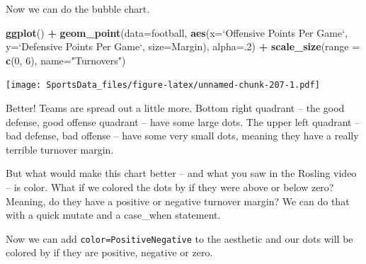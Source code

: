 \documentclass[]{book}
\newenvironment{Shaded}{\begin{snugshade}}{\end{snugshade}}
\newcommand{\DataTypeTok}[1]{\textcolor[rgb]{0.13,0.29,0.53}{#1}}
\newcommand{\DecValTok}[1]{\textcolor[rgb]{0.00,0.00,0.81}{#1}}
\newcommand{\KeywordTok}[1]{\textcolor[rgb]{0.13,0.29,0.53}{\textbf{#1}}}
\newcommand{\NormalTok}[1]{#1}
\newcommand{\OperatorTok}[1]{\textcolor[rgb]{0.81,0.36,0.00}{\textbf{#1}}}
\newcommand{\StringTok}[1]{\textcolor[rgb]{0.31,0.60,0.02}{#1}}
\begin{document}
Now we can do the bubble chart.

\begin{Shaded}
\begin{Highlighting}[]
\KeywordTok{ggplot}\NormalTok{() }\OperatorTok{+}\StringTok{ }\KeywordTok{geom_point}\NormalTok{(}\DataTypeTok{data=}\NormalTok{football, }\KeywordTok{aes}\NormalTok{(}\DataTypeTok{x=}\StringTok{`}\DataTypeTok{Offensive Points Per Game}\StringTok{`}\NormalTok{, }\DataTypeTok{y=}\StringTok{`}\DataTypeTok{Defensive Points Per Game}\StringTok{`}\NormalTok{, }\DataTypeTok{size=}\NormalTok{Margin), }\DataTypeTok{alpha=}\NormalTok{.}\DecValTok{2}\NormalTok{) }\OperatorTok{+}\StringTok{ }\KeywordTok{scale_size}\NormalTok{(}\DataTypeTok{range =} \KeywordTok{c}\NormalTok{(}\DecValTok{0}\NormalTok{, }\DecValTok{6}\NormalTok{), }\DataTypeTok{name=}\StringTok{"Turnovers"}\NormalTok{)}
\end{Highlighting}
\end{Shaded}

\texttt{[image: SportsData\_files/figure-latex/unnamed-chunk-207-1.pdf]}

Better! Teams are spread out a little more. Bottom right quadrant -- the good defense, good offense quadrant -- have some large dots. The upper left quadrant -- bad defense, bad offense -- have some very small dots, meaning they have a really terrible turnover margin.

But what would make this chart better -- and what you saw in the Rosling video -- is color. What if we colored the dots by if they were above or below zero? Meaning, do they have a positive or negative turnover margin? We can do that with a quick mutate and a case\_when statement.

\begin{Shaded}
\end{Shaded}

Now we can add \texttt{color=PositiveNegative} to the aesthetic and our dots will be colored by if they are positive, negative or zero.
\end{document}
